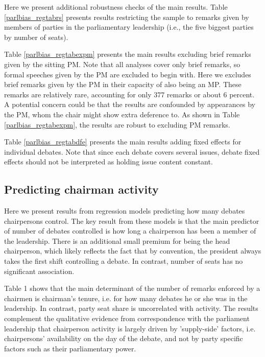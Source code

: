 \documentclass[12pt,a4paper]{article}
\begin{document}
Here we present additional robustness checks of the main results. Table \ref{parlbias_regtabrs} presents results restricting the sample to remarks given by members of parties in the parliamentary leadership (i.e., the five biggest parties by number of seats).



Table \ref{parlbias_regtabexpm} presents the main results excluding brief remarks given by the sitting PM. Note that all analyses cover only brief remarks, so formal speeches given by the PM are excluded to begin with. Here we excludes brief remarks given by the PM in their capacity of also being an MP. These remarks are relatively rare, accounting for only 377 remarks or about 6 percent. A potential concern could be that the results are confounded by appearances by the PM, whom the chair might show extra deference to. As shown in Table \ref{parlbias_regtabexpm}, the results are robust to excluding PM remarks.



Table \ref{parlbias_regtabdfe} presents the main results adding fixed effects for individual debates. Note that since each debate covers several issues, debate fixed effects should not be interpreted as holding issue content constant.



\clearpage

\subsection{Predicting chairman activity}\label{appact}

Here we present results from regression models predicting how many debates chairpersons control. The key result from these models is that the main predictor of number of debates controlled is how long a chairperson has been a member of the leadership. There is an additional small premium for being the head chairperson, which likely reflects the fact that by convention, the president always takes the first shift controlling a debate. In contrast, number of seats has no significant association.



Table 1 shows that the main determinant of the number of remarks enforced by a chairmen is chairman's tenure, i.e. for how many debates he or she was in the leadership. In contrast, party seat share is uncorrelated with activity. The results complement the qualitative evidence from correspondence with the parliament leadership that chairperson activity is largely driven by 'supply-side' factors, i.e. chairpersons' availability on the day of the debate, and not by party specific factors such as their parliamentary power.
\end{document}
